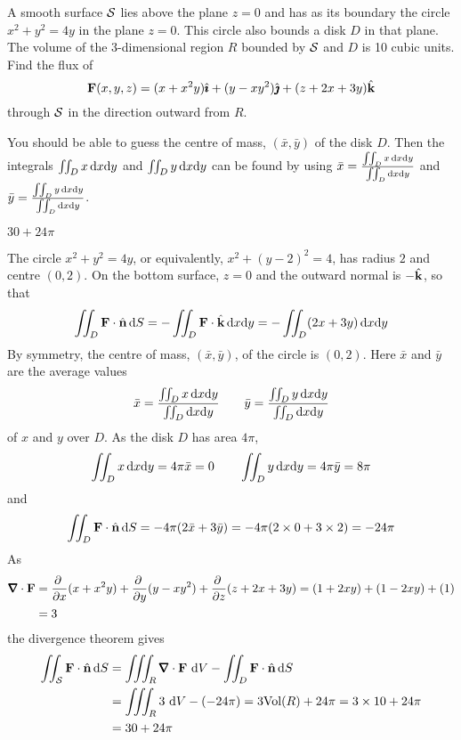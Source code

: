 \begin{question}[M317 2000A] %
A smooth surface $\mathcal{S}$ lies above the plane $z=0$ and has
as its boundary the circle $x^2+y^2=4y$ in the plane $z=0$. This circle
also bounds a disk $D$ in that plane. The volume of the 3-dimensional region
$R$ bounded by $\mathcal{S}$ and $D$ is 10 cubic units. Find the flux of
$$
\mathbf{F}(x,y,z)=(x+x^2y)\hat{\pmb{\imath}}+(y-xy^2)\hat{\pmb{\jmath}}+(z+2x+3y)\hat{\mathbf{k}}
$$
through $\mathcal{S}$ in the direction outward from $R$.
\end{question}

\begin{hint} 
You should be able to guess the centre of mass, $(\bar x,\bar y)$
of the disk $D$. Then the integrals $\iint_D x\,\mathrm{d}x\mathrm{d}y$
and $\iint_D y\,\mathrm{d}x\mathrm{d}y$ can be found by using
$\bar x = \frac{\iint_D x\,\mathrm{d}x\mathrm{d}y}{\iint_D \mathrm{d}x\mathrm{d}y}$
and
$\bar y = \frac{\iint_D y\,\mathrm{d}x\mathrm{d}y}{\iint_D \mathrm{d}x\mathrm{d}y}$.
\end{hint}

\begin{answer} 
$30+24\pi$
\end{answer}

\begin{solution} 
The circle $x^2+y^2=4y$, or equivalently, $x^2+(y-2)^2=4$, has radius
$2$ and centre $(0,2)$.
On the bottom surface, $z=0$ and 
the outward normal is $-\hat{\mathbf{k}}$, so that
$$
\iint_{D}\mathbf{F}\cdot\hat{\mathbf{n}}\,\mathrm{d}S
=-\iint_{D}\mathbf{F}\cdot\hat{\mathbf{k}}\,\mathrm{d}x\mathrm{d}y
=-\iint_D(2x+3y)\,\mathrm{d}x\mathrm{d}y
$$
By symmetry, the centre of mass, $(\bar x,\bar y)$, of the circle
is $(0,2)$. Here $\bar x$ and $\bar y$ are the average values
\begin{align*}
\bar x = \frac{\iint_D x\,\mathrm{d}x\mathrm{d}y}{\iint_D \mathrm{d}x\mathrm{d}y}\qquad
\bar y = \frac{\iint_D y\,\mathrm{d}x\mathrm{d}y}{\iint_D \mathrm{d}x\mathrm{d}y}
\end{align*}
of $x$ and $y$ over $D$.
As the disk $D$ has area $4\pi$,
\begin{equation*}
\iint_D x\,\mathrm{d}x\mathrm{d}y =4\pi\bar x =0\qquad
\iint_D y\,\mathrm{d}x\mathrm{d}y =4\pi\bar y =8\pi
\end{equation*}
and
$$
\iint_{D}\mathbf{F}\cdot\hat{\mathbf{n}}\,\mathrm{d}S
=-4\pi(2\bar x+3\bar y)
=-4\pi(2\times 0+3\times 2)
=-24\pi
$$
As
\begin{align*}
\vnabla\cdot\vF
&=\pdiff{}{x}(x+x^2y)
+\pdiff{}{y}(y-xy^2)
+\pdiff{}{z}(z+2x+3y)
=(1+2xy)+(1-2xy)+(1)\\
&=3
\end{align*}
the divergence theorem gives
\begin{align*}
\dblInt_{\cS}\vF\cdot\hn\,\dee{S}
&=\tripInt_R\vnabla\cdot\vF\ \dee{V}
-\dblInt_{D}\vF\cdot\hn\,\dee{S}\\
&=\tripInt_R3\ \dee{V}
-(-24\pi)
=3\text{Vol}(R)+24\pi
=3\times10+24\pi \\
&=30+24\pi
\end{align*}

\end{solution}